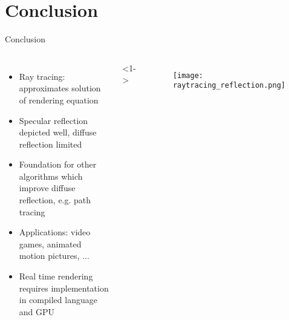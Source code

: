 \section{Conclusion}

\begin{frame}{Conclusion}
\begin{columns}
\begin{itemize}
    \item<1-> Ray tracing: approximates solution of rendering equation
    \item<2-> Specular reflection depicted well, diffuse reflection limited
    \item<3-> Foundation for other algorithms which improve diffuse reflection, e.g. path tracing
    \item<4-> Applications: video games, animated motion pictures, ...
    \item<5-> Real time rendering requires implementation in compiled
    language and GPU
\end{itemize}
<1->
\begin{figure}
            \centering
            \texttt{[image: raytracing\_reflection.png]}
        \end{figure}
\end{columns}
\end{frame}